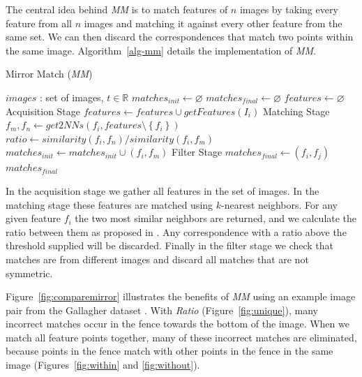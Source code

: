 %
The central idea behind \emph{MM} is to match features of $n$ images by 
taking every feature from all $n$ images and matching it against every 
other feature from the same set. We can then discard the correspondences 
that match two points within the same image. Algorithm~\ref{alg-mm} details  
the implementation of \emph{MM}.
%
\begin{algorithm}
\caption{Mirror Match (\emph{MM})}
\label{alg-mm}
\begin{algorithmic}
\Require $images$ : set of images, $t \in \mathbb{R}$
\State $matches_{init}\gets \varnothing$
\State $matches_{final}\gets \varnothing$
\State $features\gets \varnothing$
 \Comment Acquisition Stage
	\State $features\gets features \cup getFeatures(I_i)$
\EndFor
{} \Comment Matching Stage
	\State $f_m,f_n \gets get2NNs(f_i, features \setminus 
	\left\{f_i\right\})$
	\State $ratio \gets similarity(f_i, f_n) / similarity(f_i, f_m)$
		\State $matches_{init} \gets matches_{init} \cup \left(f_i, f_m\right)$
	\EndIf
\EndFor
{} \Comment Filter 
Stage
		\State $matches_{final} \gets (f_i, f_j)$
	\EndIf
\EndFor \\
\Return $matches_{final}$
\end{algorithmic}
\end{algorithm}
%
In the acquisition stage we gather all features in the set of images.  
In the matching stage these features are matched using $k$-nearest 
neighbors.  For any given feature $f_i$ the two most similar neighbors 
are returned, and we calculate the ratio between them as proposed in 
\cite{lowe2004sift}.  Any correspondence with a ratio above the 
threshold supplied will be discarded. Finally in the filter stage we 
check that matches are from different images and discard all matches 
that are not symmetric.

Figure~\ref{fig:comparemirror} illustrates the benefits of \emph{MM} 
using an example image pair from the Gallagher dataset 
\cite{gallagher2008}.
With \emph{Ratio} (Figure~\ref{fig:unique}), many incorrect matches occur 
in the fence towards the bottom of the image.
When we match all feature points together, many of these incorrect 
matches are eliminated, because points in the fence match with other 
points in the fence in the same image (Figures~\ref{fig:within} and
\ref{fig:without}).


